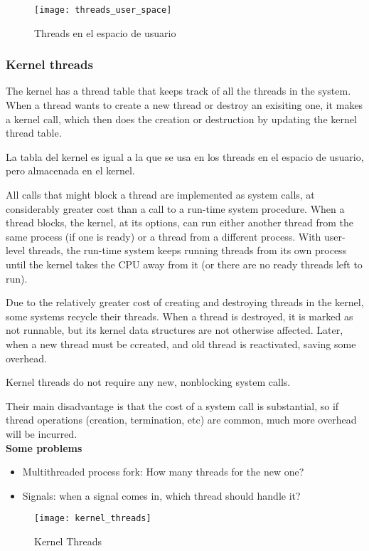 \documentclass[a4paper, twoside]{article}
\begin{document}
\begin{figure}[H]
	\centering
	\texttt{[image: threads\_user\_space]}
	\caption{Threads en el espacio de usuario}
	\label{fig:threads_user_space}
\end{figure}

\subsubsection{Kernel threads}
The kernel has a thread table that keeps track of all the threads in the system. When a thread wants to create a new thread or destroy an exisiting one, it makes a kernel call, which then does the creation or destruction by updating the kernel thread table.

La tabla del kernel es igual a la que se usa en los threads en el espacio de usuario, pero almacenada en el kernel.

All calls that might block a thread are implemented as system calls, at considerably greater cost than a call to a run-time system procedure. When a thread blocks, the kernel, at its options, can run either another thread from the same process (if one is ready) or a thread from a different process. With user-level threads, the run-time system keeps running threads from its own process until the kernel takes the CPU away from it (or there are no ready threads left to run).

Due to the relatively greater cost of creating and destroying threads in the kernel, some systems recycle their threads. When a thread is destroyed, it is marked as not runnable, but its kernel data structures are not otherwise affected. Later, when a new thread must be ccreated, and old thread is reactivated, saving some overhead.

Kernel threads do not require any new, nonblocking system calls.

Their main disadvantage is that the cost of a system call is substantial, so if thread operations (creation, termination, etc) are common, much more overhead will be incurred.\\

\textbf{Some problems}
\begin{itemize}
	\item Multithreaded process fork: How many threads for the new one?
	\item Signals: when a signal comes in, which thread should handle it?
\end{itemize}

\begin{figure}[H]
	\centering
	\texttt{[image: kernel\_threads]}
	\caption{Kernel Threads}
	\label{fig:kernel_threads}
\end{figure}
\end{document}
